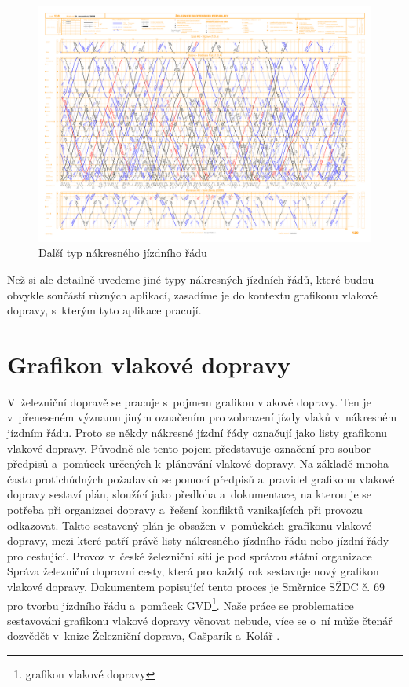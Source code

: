 \begin{figure}[ht]
	\centering
	\includegraphics[width=\textwidth]{../img/kap1_slovensko}
	\caption{Další typ nákresného jízdního řádu}
	\label{fig:uvod:slovensky_njr}
\end{figure}
\newpage
Než si ale detailně uvedeme jiné typy nákresných jízdních řádů, které budou obvykle součástí různých aplikací, zasadíme je do kontextu grafikonu vlakové dopravy, s~kterým tyto aplikace pracují.

\section{Grafikon vlakové dopravy}
V~železniční dopravě se pracuje s~pojmem grafikon vlakové dopravy. Ten je v~přeneseném významu jiným označením pro zobrazení jízdy vlaků v~nákresném jízdním řádu. Proto se někdy nákresné jízdní řády označují jako listy grafikonu vlakové dopravy. Původně ale tento pojem představuje označení pro soubor předpisů a~pomůcek určených k~plánování vlakové dopravy. Na základě mnoha často protichůdných požadavků se pomocí předpisů a~pravidel grafikonu vlakové dopravy sestaví plán, sloužící jako předloha a~dokumentace, na kterou je se potřeba při organizaci dopravy a~řešení konfliktů vznikajících při provozu odkazovat. Takto sestavený plán je obsažen v~pomůckách grafikonu vlakové dopravy, mezi které patří právě listy nákresného jízdního řádu nebo jízdní řády pro cestující. Provoz v~české železniční síti je pod správou státní organizace Správa železniční dopravní cesty, která pro každý rok sestavuje nový grafikon vlakové dopravy. Dokumentem popisující tento proces je Směrnice SŽDC č. 69 pro tvorbu jízdního řádu a~pomůcek GVD\footnote{grafikon vlakové dopravy}. Naše práce se problematice sestavování grafikonu vlakové dopravy věnovat nebude, více se o~ní může čtenář dozvědět v~knize Železniční doprava, Gašparík a~Kolář \cite{zel_doprava}.


